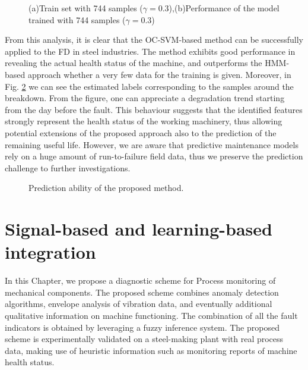 \begin{figure}[h!]
    \begin{subfigure}{.5\textwidth}    
    \centering
    
    
    \end{subfigure}
        \begin{subfigure}{.5\textwidth}
    \centering
    
     
    \end{subfigure}
\caption{(a)Train set with 744 samples ($\gamma=0.3$),(b)Performance of the model trained with 744 samples ($\gamma=0.3$)}
    \label{fig:Trai-testLArge}
\end{figure}
From this analysis, it is clear that the OC-SVM-based method can be successfully applied to the FD in steel industries. The method exhibits good performance in revealing the actual health status of the machine, and outperforms the HMM-based approach whether a very few data for the training is given. Moreover, in Fig. \ref{fig: degrad} we can see the estimated labels corresponding to the samples around the breakdown. From the figure, one can appreciate a degradation trend starting from the day before the fault. This behaviour suggests that the identified features strongly represent the health status of the working machinery, thus allowing potential extensions of the proposed approach also to the prediction of the remaining useful life. However, we are aware that predictive maintenance models rely on a huge amount of run-to-failure field data, thus we preserve the prediction challenge to further investigations.
\begin{figure}[h]
	\centering
	\vspace{0.1cm}
	
	\vspace{-0.2cm}
	\caption{Prediction ability of the proposed method.}
	\label{fig: degrad}
\end{figure}





\chapter{Signal-based and learning-based integration}


\label{Chapter:6}

In this Chapter, we propose a diagnostic scheme for Process monitoring of mechanical components. The proposed scheme combines anomaly detection algorithms, envelope analysis of vibration data, and eventually additional qualitative information on machine functioning. The combination of all the fault indicators is obtained by leveraging a fuzzy inference system. The proposed scheme is experimentally validated on a steel-making plant with real process data, making use of heuristic information such as monitoring reports of machine health status.

